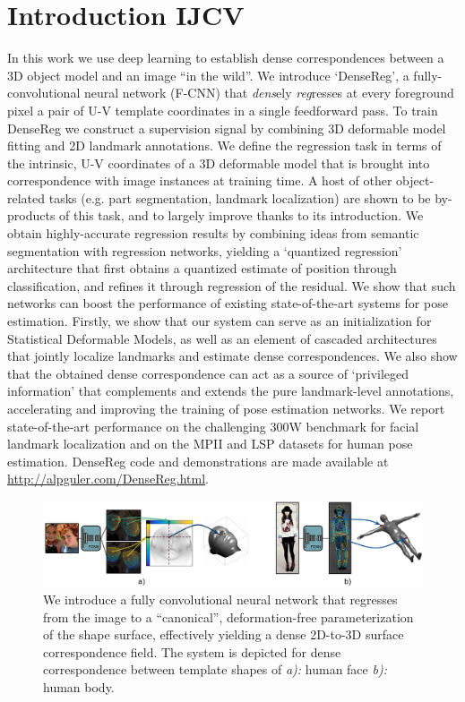 \section{Introduction IJCV}
In this work we use deep learning to establish dense correspondences between a 3D object model and an image  ``in the wild''. We introduce `DenseReg', 
 a  fully-convolutional neural network (F-CNN) that  {\em{dens}}ely {\em{reg}}resses  at every foreground pixel a pair of U-V template coordinates in a single feedforward pass. 
To train DenseReg we construct a supervision signal by combining 3D deformable model fitting and 2D landmark annotations. We define the regression task in terms of the intrinsic, U-V coordinates of a 3D deformable model that is brought into correspondence with image instances at training time. A host of other object-related tasks (e.g. part segmentation, landmark localization) are shown to be by-products of this task, and to largely improve thanks to its introduction. 
We obtain highly-accurate regression results by combining ideas from semantic segmentation with regression networks, yielding a `quantized regression' architecture that first obtains a quantized estimate of position through classification, and refines it through regression of the residual.
We show that such networks can boost the performance of existing state-of-the-art systems for pose estimation. 
Firstly, we show that 
our system can serve as an initialization for Statistical Deformable Models, as well as an element of cascaded architectures that jointly localize landmarks and estimate dense correspondences. We also show that  the obtained dense correspondence can act as  a  source  of  ‘privileged  information’  that  complements and extends the pure landmark-level annotations, accelerating and improving the training of pose estimation networks.
We report state-of-the-art performance  on the challenging 300W benchmark for facial landmark localization and on the MPII and LSP datasets for human pose estimation.
DenseReg code and demonstrations are made available at \url{http://alpguler.com/DenseReg.html}.




\begin{figure}[h!]
    \begin{center}
       \includegraphics[width=1\linewidth]{resources/Human_Poses/denseregPami2}
    \end{center}
       \caption{ We introduce a fully convolutional neural network that regresses from the image to a ``canonical'', deformation-free parameterization of the shape surface, effectively yielding a dense 2D-to-3D surface correspondence field. The system is depicted for dense correspondence between template shapes of \textit{a):} human face \textit{b):} human body.}
    \label{fig:intro_human_pose}
\end{figure}
    

